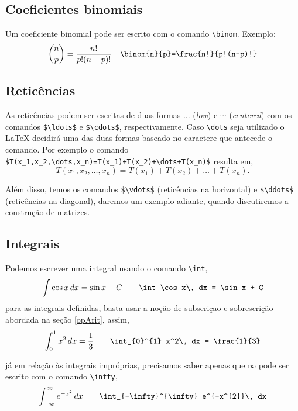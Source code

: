 \subsection{Coeficientes binomiais}
Um coeficiente binomial pode ser escrito com o comando \verb|\binom|. Exemplo:
\begin{equation*}
    \dbinom{n}{p} = \frac{n!}{p!(n-p)!} \quad \verb|\binom{n}{p}=\frac{n!}{p!(n-p)!}|
\end{equation*}

\subsection{Retic\^{e}ncias}
As retic\^{e}ncias podem ser escritas de duas formas $\ldots$ (\textit{low}) e $\cdots$ (\textit{centered}) com os comandos \verb|$\ldots$| e \verb|$\cdots$|, respectivamente. Caso \verb|\dots| seja utilizado o \LaTeX $ $ decidir\'{a} uma das duas formas baseado no caractere que antecede o comando. Por exemplo o comando \verb|$T(x_1,x_2,\dots,x_n)=T(x_1)+T(x_2)+\dots+T(x_n)$| resulta em,
\begin{equation*}
    T(x_1,x_2,\dots,x_n)=T(x_1)+T(x_2)+\dots+T(x_n).
\end{equation*}

\noindent Al\'{e}m disso, temos os comandos \verb|$\vdots$| (retic\^{e}ncias na horizontal) e \verb|$\ddots$| (retic\^{e}ncias na diagonal), daremos um exemplo adiante, quando discutiremos a construç\~{a}o de matrizes.

\subsection{Integrais}
Podemos escrever uma integral usando o comando \verb|\int|,
\begin{equation*}
    \int \cos x\, dx = \sin x + C \qquad \verb|\int \cos x\, dx = \sin x + C|
\end{equation*}
para as integrais definidas, basta usar a noç\~{a}o de subscriçao e sobrescriç\~{a}o abordada na seç\~{a}o \ref{opArit}, assim,
\begin{equation*}
    \int_{0}^{1} x^2\, dx = \frac{1}{3} \qquad \verb|\int_{0}^{1} x^2\, dx = \frac{1}{3}|
\end{equation*}

\noindent j\'{a} em relaç\~{a}o \`as integrais impr\'{o}prias, precisamos saber apenas que $\infty$ pode ser escrito com o comando \verb|\infty|,
\begin{equation*}
    \int_{-\infty}^{\infty} e^{-x^{2}}\, dx \qquad \verb|\int_{-\infty}^{\infty} e^{-x^{2}}\, dx|
\end{equation*}


